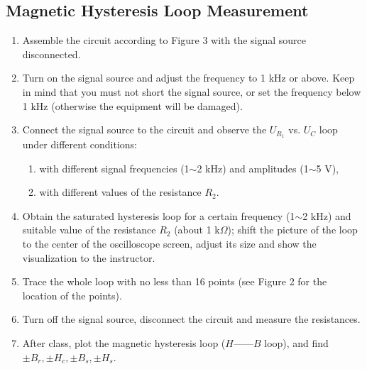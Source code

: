 \documentclass[12pt]{article}
\begin{document}
\subsection{Magnetic Hysteresis Loop Measurement}
\begin{enumerate}
\item Assemble the circuit according to Figure 3 with the signal source disconnected.
\item Turn on the signal source and adjust the frequency to 1 kHz or above. Keep in
mind that you must not short the signal source, or set the frequency below 1 kHz
(otherwise the equipment will be damaged).
\item Connect the signal source to the circuit and observe the $U_{R_1}$ vs. $U_C$ loop under
different conditions:
\begin{enumerate}[(1)]
\item with different signal frequencies (1$\sim$2 kHz) and amplitudes (1$\sim$5 V),
\item with different values of the resistance $R_2$.
\end{enumerate}
\item Obtain the saturated hysteresis loop for a certain frequency (1$\sim$2 kHz) and
suitable value of the resistance $R_2$ (about 1 k$\Omega$); shift the picture of the loop to the center of the oscilloscope screen, adjust its size and show the visualization to the
instructor.
\item Trace the whole loop with no less than 16 points (see Figure 2 for the location of
the points).
\item Turn off the signal source, disconnect the circuit and measure the resistances.
\item After class, plot the magnetic hysteresis loop ($H——B$ loop), and find $\pm B_r,\pm H_c, \pm B_s,\pm H_s.$
\end{enumerate}
\end{document}
